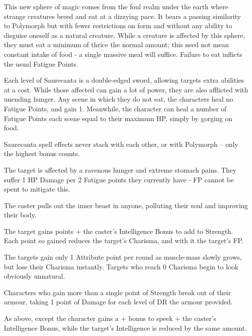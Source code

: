 \begin{multicols}{2}

This new sphere of magic comes from the foul realm under the earth where strange creatures breed and eat at a dizzying pace.  It bears a passing similarity to Polymorph but with fewer restrictions on form and without any ability to disguise oneself as a natural creature.  While a creature is affected by this sphere, they must eat a minimum of thrice the normal amount; this need not mean constant intake of food - a single massive meal will suffice.  Failure to eat inflicts the usual Fatigue Points.

	Each level of Saurecanta is a double-edged sword, allowing targets extra abilities at a cost.  While those affected can gain a lot of power, they are also afflicted with unending hunger.  Any scene in which they do not eat, the characters heal no Fatigue Points, and gain 1.  Meanwhile, the character can heal a number of Fatigue Points each scene equal to their maximum HP, simply by gorging on food.

	Saurecanta spell effects never stack with each other, or with Polymorph -- only the highest bonus counts.

\spelllevel \label{saurecantaone}
The target is affected by a ravenous hunger and extreme stomach pains.  They suffer 1 HP Damage per 2 Fatigue points they currently have - FP cannot be spent to mitigate this.

\spelllevel
{}
The caster pulls out the inner beast in anyone, polluting their soul and improving their body.

The target gains  points + the caster's Intelligence Bonus to add to Strength.  Each point so gained reduces the target's Charisma, and with it the target's FP.

The targets gain only 1 Attribute point per round as muscle-mass slowly grows, but lose their Charisma instantly.  Targets who reach 0 Charisma begin to look obviously unnatural.

Characters who gain more than a single point of Strength break out of their armour, taking 1 point of Damage for each level of DR the armour provided.

As above, except the character gains a + bonus to speek + the caster's Intelligence Bonus, while the target's Intelligence is reduced by the same amount.


\end{multicols}
